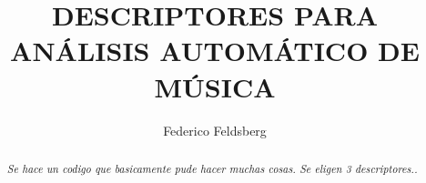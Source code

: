 \documentclass[]{article}
\title{\textbf{\LARGE{\textsf{DESCRIPTORES PARA ANÁLISIS AUTOMÁTICO DE MÚSICA}}}}
\date{} %
\begin{document}


\renewcommand{\headrulewidth}{0pt} %


\author[1]{Federico Feldsberg} %


\begin{minipage}[h]{\textwidth} %
    \maketitle
    \thispagestyle{fancy}
    \fancyhf{}
    \cfoot{\thepage}

\end{minipage}


\begin{abstract}

\textit{Se hace un codigo que basicamente pude hacer muchas cosas. Se eligen 3 descriptores..\lipsum[1]}

\end{abstract}

\vspace{1.5cm}%
\end{document}
